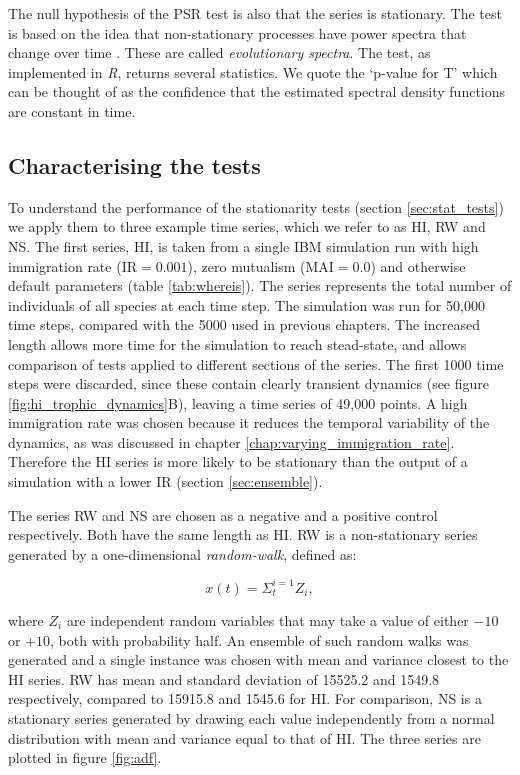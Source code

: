 The null hypothesis of the PSR test is also that the series is stationary. The test is based on the idea that non-stationary processes have power spectra that change over time \cite{priestley1969test}. These are called \emph{evolutionary spectra}. The test, as implemented in \emph{R}, returns several statistics. We quote the `p-value for T' which can be thought of as the confidence that the estimated spectral density functions are constant in time.

\subsection{Characterising the tests}
\label{sec:characterising_stat_tests}


To understand the performance of the stationarity tests (section \ref{sec:stat_tests}) we apply them to three example time series, which we refer to as HI, RW and NS. The first series, HI, is taken from a single IBM simulation run with high immigration rate (IR$=0.001$), zero mutualism (MAI$=0.0$) and otherwise default parameters (table \ref{tab:whereis}).  The series represents the total number of individuals of all species at each time step. The simulation was run for 50,000 time steps, compared with the 5000 used in previous chapters. The increased length allows more time for the simulation to reach stead-state, and allows comparison of tests applied to different sections of the series. The first 1000 time steps were discarded, since these contain clearly transient dynamics (see figure \ref{fig:hi_trophic_dynamics}B), leaving a time series of 49,000 points. A high immigration rate was chosen because it reduces the temporal variability of the dynamics, as was discussed in chapter \ref{chap:varying_immigration_rate}. Therefore the HI series is more likely to be stationary than the output of a simulation with a lower IR (section \ref{sec:ensemble}).

The series RW and NS are chosen as a negative and a positive control respectively. Both have the same length as HI. RW is a non-stationary series generated by a one-dimensional \emph{random-walk}, defined as:

\begin{equation}
	x(t) = \Sigma_{t}^{i=1} Z_i, 
\end{equation}   

where $Z_i$ are independent random variables that may take a value of either $-10$ or $+10$, both with probability half. An ensemble of such random walks was generated and a single instance was chosen with mean and variance closest to the HI series. RW has mean and standard deviation of 15525.2 and 1549.8 respectively, compared to 15915.8 and 1545.6 for HI. For comparison, NS is a stationary series generated by drawing each value independently from a normal distribution with mean and variance  equal to that of HI. The three series are plotted in figure \ref{fig:adf}.
  
